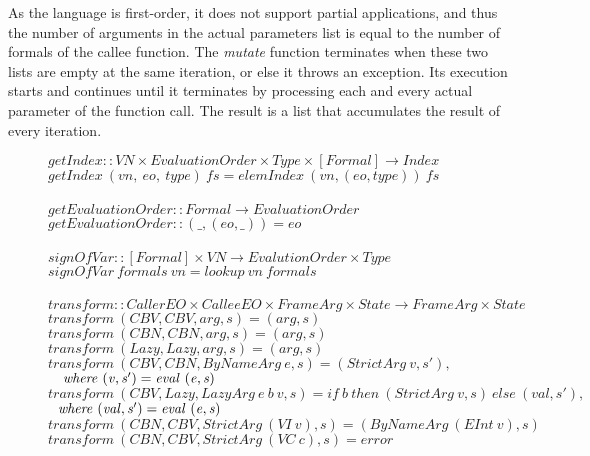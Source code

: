 \documentclass[diploma]{softlab-thesis}
\begin{document}
As the language is first-order, it does not support partial applications, and thus the number of arguments 
in the actual parameters list is equal to the number of formals of the callee function. The \textit{mutate} function 
terminates when these two lists are empty at the same iteration, or else it throws an exception. Its execution starts 
and continues until it terminates by processing each and every actual parameter of the function call. The result is 
a list that accumulates the result of every iteration. 


\begin{figure}[h]
  $\mathit{getIndex :: VN \times EvaluationOrder \times Type \times [Formal] \rightarrow Index}$ \\
  $\mathit{getIndex~(vn,~eo,~type)~fs=elemIndex~(vn,(eo,type))~fs}$ \\
  \\
  $\mathit{getEvaluationOrder :: Formal \rightarrow EvaluationOrder} $ \\
  $\mathit{getEvaluationOrder :: (\_, (eo, \_)) = eo}$ \\
  \\%
  $\mathit{signOfVar :: [Formal] \times VN \rightarrow EvalutionOrder \times Type } $ \\
  $\mathit{signOfVar~formals~vn = lookup~vn~formals}$ \\
  \\%
  $\mathit{transform :: CallerEO \times CalleeEO \times FrameArg \times 
            State \rightarrow FrameArg \times State}$ \\
  $\mathit{transform~(CBV, CBV, arg, s) = (arg, s)}$ \\
  $\mathit{transform~(CBN, CBN, arg, s) = (arg, s)}$ \\
  $\mathit{transform~(Lazy, Lazy, arg, s) = (arg, s)}$ \\
  $\mathit{transform~(CBV, CBN, ByNameArg~e, s) = (StrictArg~v, s'),}$ \\
  $\mathit{\hspace*{1em} where~(v, s') = eval~(e, s)}$ \\
  $\mathit{transform~(CBV, Lazy, LazyArg~e~b~v, s) = 
              if~b~then~(StrictArg~v, s)~else~(val, s'),}$ \\
  $\mathit{\hfill\ \hfill\ where~(val, s') = eval~(e, s)} $ \\
  $\mathit{transform~(CBN, CBV, StrictArg~(VI~v),s)=(ByNameArg~(EInt~v),s)}$ \\
  $\mathit{transform~(CBN, CBV, StrictArg~(VC~c),s)=error}$ \\

\end{figure}
\end{document}
